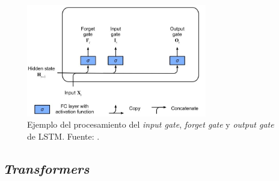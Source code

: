 \begin{figure}[H]
	\centering
	\includegraphics[width=0.7\textwidth]{../img/neoantigen/lstm}
	\caption{Ejemplo del procesamiento del \textit{input gate}, \textit{forget gate} y \textit{output gate} de LSTM. Fuente: \cite{zhang2021dive}.}
	\label{fig:lstm}
\end{figure}

\subsection{\textit{Transformers}}


